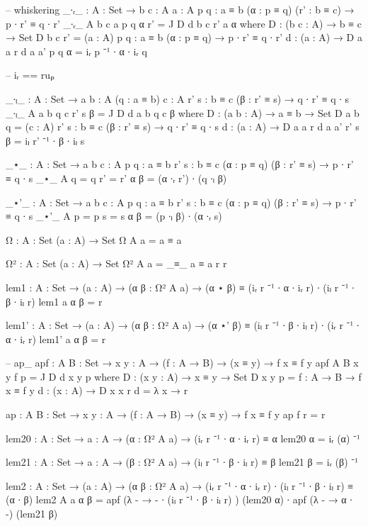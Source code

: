 \documentclass[11pt, a4paper]{article}
\begin{document}
\begin{code}

  -- whiskering _∙ᵣ_ : {A : Set} → {b c : A} {a : A} {p q : a ≡ b} (α : p ≡ q)
(r' : b ≡ c) → p ∙ r' ≡ q ∙ r' _∙ᵣ_ {A} {b} {c} {a} {p} {q} α r' = J D d b c r'
a α where D : (b c : A) → b ≡ c → Set D b c r' = (a : A) {p q : a ≡ b} (α : p ≡
q) → p ∙ r' ≡ q ∙ r' d : (a : A) → D a a r d a a' {p} {q} α = iᵣ p ⁻¹ ∙ α ∙ iᵣ q

  -- iᵣ == ruₚ

  _∙ₗ_ : {A : Set} → {a b : A} (q : a ≡ b) {c : A} {r' s : b ≡ c} (β : r' ≡ s) →
q ∙ r' ≡ q ∙ s _∙ₗ_ {A} {a} {b} q {c} {r'} {s} β = J D d a b q c β where D : (a
b : A) → a ≡ b → Set D a b q = (c : A) {r' s : b ≡ c} (β : r' ≡ s) → q ∙ r' ≡ q
∙ s d : (a : A) → D a a r d a a' {r'} {s} β = iₗ r' ⁻¹ ∙ β ∙ iₗ s

  _⋆_ : {A : Set} → {a b c : A} {p q : a ≡ b} {r' s : b ≡ c} (α : p ≡ q) (β : r'
≡ s) → p ∙ r' ≡ q ∙ s _⋆_ {A} {q = q} {r' = r'} α β = (α ∙ᵣ r') ∙ (q ∙ₗ β)

  _⋆'_ : {A : Set} → {a b c : A} {p q : a ≡ b} {r' s : b ≡ c} (α : p ≡ q) (β :
r' ≡ s) → p ∙ r' ≡ q ∙ s _⋆'_ {A} {p = p} {s = s} α β = (p ∙ₗ β) ∙ (α ∙ᵣ s)

  Ω : {A : Set} (a : A) → Set Ω {A} a = a ≡ a

  Ω² : {A : Set} (a : A) → Set Ω² {A} a = _≡_ {a ≡ a} r r

  lem1 : {A : Set} → (a : A) → (α β : Ω² {A} a) → (α ⋆ β) ≡ (iᵣ r ⁻¹ ∙ α ∙ iᵣ r)
∙ (iₗ r ⁻¹ ∙ β ∙ iₗ r) lem1 a α β = r

  lem1' : {A : Set} → (a : A) → (α β : Ω² {A} a) → (α ⋆' β) ≡ (iₗ r ⁻¹ ∙ β ∙ iₗ
r) ∙ (iᵣ r ⁻¹ ∙ α ∙ iᵣ r) lem1' a α β = r

  -- ap\_ apf : {A B : Set} → {x y : A} → (f : A → B) → (x ≡ y) → f x ≡ f y apf
{A} {B} {x} {y} f p = J D d x y p where D : (x y : A) → x ≡ y → Set D x y p = {f
: A → B} → f x ≡ f y d : (x : A) → D x x r d = λ x → r

  ap : {A B : Set} → {x y : A} → (f : A → B) → (x ≡ y) → f x ≡ f y ap f r = r

  lem20 : {A : Set} → {a : A} → (α : Ω² {A} a) → (iᵣ r ⁻¹ ∙ α ∙ iᵣ r) ≡ α lem20
α = iᵣ (α) ⁻¹

  lem21 : {A : Set} → {a : A} → (β : Ω² {A} a) → (iₗ r ⁻¹ ∙ β ∙ iₗ r) ≡ β lem21
β = iᵣ (β) ⁻¹

  lem2 : {A : Set} → (a : A) → (α β : Ω² {A} a) → (iᵣ r ⁻¹ ∙ α ∙ iᵣ r) ∙ (iₗ r
⁻¹ ∙ β ∙ iₗ r) ≡ (α ∙ β) lem2 {A} a α β = apf (λ - → - ∙ (iₗ r ⁻¹ ∙ β ∙ iₗ r) )
(lem20 α) ∙ apf (λ - → α ∙ -) (lem21 β)


\end{code}
\end{document}

